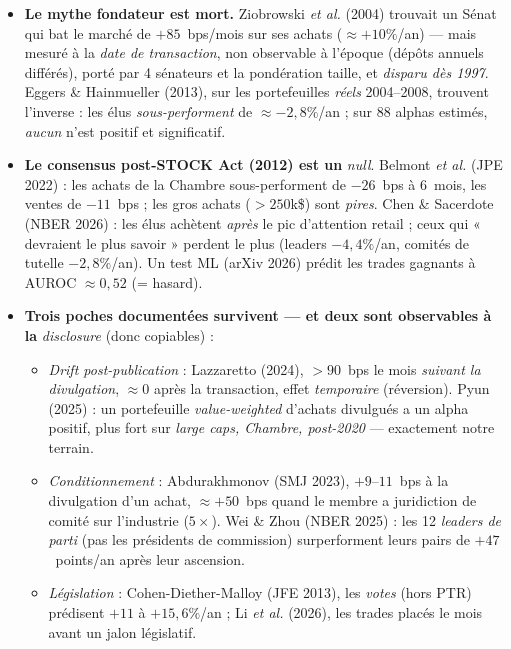 \documentclass[11pt,a4paper]{article}
\newcommand{\vivant}{\textcolor{vert}{$\star$}}
\begin{document}
\begin{itemize}
  \item \textbf{Le mythe fondateur est mort.} Ziobrowski \textit{et al.} (2004) trouvait un Sénat qui bat le
  marché de $+85$~bps/mois sur ses achats ($\approx +10\%$/an) --- mais mesuré à la \emph{date de transaction},
  non observable à l'époque (dépôts annuels différés), porté par 4 sénateurs et la pondération taille, et
  \emph{disparu dès 1997}. Eggers \& Hainmueller (2013), sur les portefeuilles \emph{réels} 2004--2008,
  trouvent l'inverse : les élus \emph{sous-performent} de $\approx -2{,}8\%$/an ; sur 88 alphas estimés,
  \emph{aucun} n'est positif et significatif.
  \item \textbf{Le consensus post-STOCK Act (2012) est un} \emph{null}. Belmont \textit{et al.} (JPE 2022) :
  les achats de la Chambre sous-performent de $-26$~bps à 6~mois, les ventes de $-11$~bps ; les gros achats
  ($>250$k\$) sont \emph{pires}. Chen \& Sacerdote (NBER 2026) : les élus achètent \emph{après} le pic
  d'attention retail ; ceux qui « devraient le plus savoir » perdent le plus (leaders $-4{,}4\%$/an, comités
  de tutelle $-2{,}8\%$/an). Un test ML (arXiv 2026) prédit les trades gagnants à AUROC $\approx 0{,}52$ (= hasard).
  \item \textbf{Trois poches documentées survivent --- et deux sont observables à la} \emph{disclosure}
  (donc copiables) :
  \begin{itemize}
    \item[\vivant] \emph{Drift post-publication} : Lazzaretto (2024), $>90$~bps le mois \emph{suivant la
    divulgation}, $\approx 0$ après la transaction, effet \emph{temporaire} (réversion). Pyun (2025) : un
    portefeuille \emph{value-weighted} d'achats divulgués a un alpha positif, plus fort sur \emph{large caps,
    Chambre, post-2020} --- exactement notre terrain.
    \item[\vivant] \emph{Conditionnement} : Abdurakhmonov (SMJ 2023), $+9$--$11$~bps à la divulgation d'un
    achat, $\approx +50$~bps quand le membre a juridiction de comité sur l'industrie ($5\times$). Wei \& Zhou
    (NBER 2025) : les 12 \emph{leaders de parti} (pas les présidents de commission) surperforment leurs pairs
    de $+47$~points/an après leur ascension.
    \item[\vivant] \emph{Législation} : Cohen-Diether-Malloy (JFE 2013), les \emph{votes} (hors PTR) prédisent
    $+11$ à $+15{,}6\%$/an ; Li \textit{et al.} (2026), les trades placés le mois avant un jalon législatif.
  \end{itemize}

\end{itemize}
\end{document}
